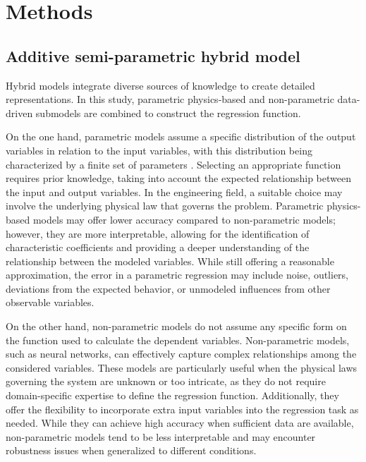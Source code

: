 \documentclass[preprint,12pt]{elsarticle}
\begin{document}
\section{Methods}\label{sec:methods}

\subsection{Additive semi-parametric hybrid model}
Hybrid models integrate diverse sources of knowledge to create detailed representations. In this study, parametric physics-based and non-parametric data-driven submodels are combined to construct the regression function. 

On the one hand, parametric models assume a specific distribution of the output variables in relation to the input variables, with this distribution being characterized by a finite set of parameters \cite{mahmoud2019parametric}. Selecting an appropriate function requires prior knowledge, taking into account the expected relationship between the input and output variables. In the engineering field, a suitable choice may involve the underlying physical law that governs the problem. Parametric physics-based models may offer lower accuracy compared to non-parametric models; however, they are more interpretable, allowing for the identification of characteristic coefficients and providing a deeper understanding of the relationship between the modeled variables. While still offering a reasonable approximation, the error in a parametric regression may include noise, outliers, deviations from the expected behavior, or unmodeled influences from other observable variables. 

On the other hand, non-parametric models do not assume any specific form on the function used to calculate the dependent variables. Non-parametric models, such as neural networks, can effectively capture complex relationships among the considered variables. These models are particularly useful when the physical laws governing the system are unknown or too intricate, as they do not require domain-specific expertise to define the regression function. Additionally, they offer the flexibility to incorporate extra input variables into the regression task as needed. While they can achieve high accuracy when sufficient data are available, non-parametric models tend to be less interpretable and may encounter robustness issues when generalized to different conditions.
\end{document}
